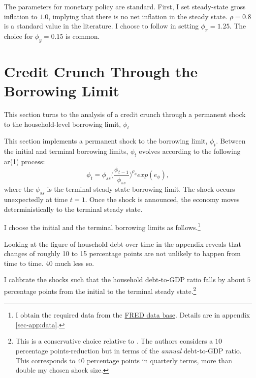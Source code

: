 \documentclass[12pt]{article} %
\numberwithin{equation}{section} %
\begin{document}
The parameters for monetary policy are standard. First, I set steady-state gross inflation to $1.0$, implying that there is no net inflation in the steady state. $\rho = 0.8$ is a standard value in the literature. I choose to follow \textcite{kaplan2018} in setting $\phi_{\pi} = 1.25$. The choice for $\phi_y = 0.15$ is common.


\section{Credit Crunch Through the Borrowing Limit}
\label{sec:limit}

This section turns to the analysis of a credit crunch through a permanent shock to the household-level borrowing limit, $\phi_t$

This section implements a permanent shock to the borrowing limit, $\phi_t$. Between the initial and terminal borrowing limits, $\phi_t$ evolves according to the following \Gls{ar}(1) process:
\begin{equation}
    \phi_t = \phi_{ss} \Bigg( \frac{\phi_{t-1}}{\phi_{ss}} \Bigg)^{\rho_{\phi}} exp(e_{\phi}), \label{eq:borrowing-limit-process}
\end{equation}
where the $\phi_{ss}$ is the terminal steady-state borrowing limit. The shock occurs unexpectedly at time $t=1$. Once the shock is announced, the economy moves deterministically to the terminal steady state. 

I choose the initial and the terminal borrowing limits as follows.\footnote{I obtain the required data from the \href{https://fred.stlouisfed.org}{FRED data base}. Details are in appendix \ref{sec-app:data}.}

Looking at the figure of household debt over time in the appendix reveals that changes of roughly 10 to 15 percentage points are not unlikely to happen from time to time. 40 much less so.

I calibrate the shocks such that the household debt-to-GDP ratio falls by about $5$ percentage points from the initial to the terminal steady state.\footnote{This is a conservative choice relative to \textcite{gl2017}. The authors considers a $10$ percentage points-reduction but in terms of the \textit{annual} debt-to-GDP ratio. This corresponds to $40$ percentage points in quarterly terms, more than double my chosen shock size.}
\end{document}
